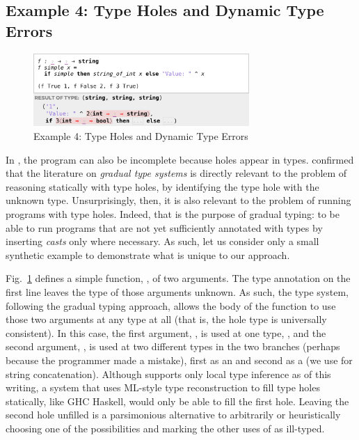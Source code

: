 
\subsection{Example 4: Type Holes and Dynamic Type Errors}
\label{sec:dynamic-type-errors}

\begin{figure}
\centering
\includegraphics[width=0.73\textwidth,interpolate=false,valign=t]{images/cast-errors.png}
\caption{Example 4: Type Holes and Dynamic Type Errors}
\label{fig:cast-errors}
\vspace{-6px}
\end{figure}


In \Hazel, the program can also be incomplete because holes appear in types. 
\citet{popl-paper} confirmed that the literature on \emph{gradual type systems} \cite{Siek06a,DBLP:conf/snapl/SiekVCB15} is directly relevant to the problem of reasoning statically with type holes, by identifying the type hole with the unknown type. 
Unsurprisingly, then, it is also relevant to the problem of running 
programs with type holes. Indeed, that is the purpose of gradual typing: to be able to run programs that are not yet sufficiently annotated with types by inserting \emph{casts} only where necessary. As such, let us consider only a small synthetic example to demonstrate what is unique to our approach.

Fig.~\ref{fig:cast-errors} defines a simple function, , of two arguments. 
The type annotation on the first line leaves the type of those arguments unknown. 
As such, the \Hazel type system, following the gradual typing approach,
allows the body of the function to use those two
arguments at any type at all (that is, the hole type is universally consistent). 
In this case, the first argument, , is used at one type, , 
and the second argument, , is used at two different types in the two branches (perhaps because the programmer made a mistake), 
first as an  and second as a   (we use \li{^} for string concatenation).
Although \Hazel supports only local type inference as of this writing, 
a system that uses ML-style type reconstruction to fill type holes statically, like GHC Haskell, would only be able to fill the first hole. Leaving the second hole unfilled is 
a parsimonious alternative to arbitrarily or heuristically choosing one of the possibilities and marking the
other uses of  as ill-typed.

